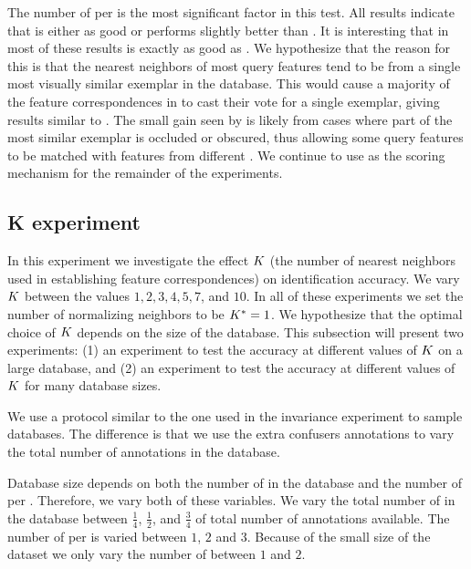         \NScoreExpt{}

        The number of \exemplars{} per \name{} is the most significant factor in this test.
        All results indicate that \nsum{} is either as good or performs slightly better than \csum{}.
        It is interesting that in most of these results \nsum{} is exactly as good as \csum{}.
        We hypothesize that the reason for this is that the nearest neighbors of most query features tend to be
          from a single most visually similar exemplar in the database.
        This would cause a majority of the feature correspondences in \nsum{} to cast their vote for a single
          exemplar, giving results similar to \csum{}.
        The small gain seen by \nsum{} is likely from cases where part of the most similar exemplar is occluded
          or obscured, thus allowing some query features to be matched with features from different \exemplars{}.
        We continue to use \nsum{} as the scoring mechanism for the remainder of the experiments.
        

    \subsection{K experiment}\label{sub:exptk}  

        In this experiment we investigate the effect $K$ (the number of nearest neighbors used in establishing
          feature correspondences) on identification accuracy.
        We vary $K$ between the values $1, 2, 3, 4, 5, 7$, and $10$.
        In all of these experiments we set the number of normalizing neighbors to be $K^{*}=1$.
        We hypothesize that the optimal choice of $K$ depends on the size of the database.
        This subsection will present two experiments:
        (1) an experiment to test the accuracy at different values of $K$ on a large database, and
        (2) an experiment to test the accuracy at different values of $K$ for many database sizes.

        We use a protocol similar to the one used in the invariance experiment to sample databases.
        The difference is that we use the extra confusers annotations to vary the total number of annotations in
          the database.

        Database size depends on both the number of \names{} in the database and the number of \exemplars{} per
          \name{}.
        Therefore, we vary both of these variables.
        We vary the total number of \exemplars{} in the database between $\frac{1}{4}$, $\frac{1}{2}$, and
          $\frac{3}{4}$ of total number of annotations available.
        The number of \exemplars{} per \name{} is varied between $1$, $2$ and $3$.
        Because of the small size of the \girmmasterI{} dataset we only vary the number of \exemplars{} between
          $1$ and $2$.

